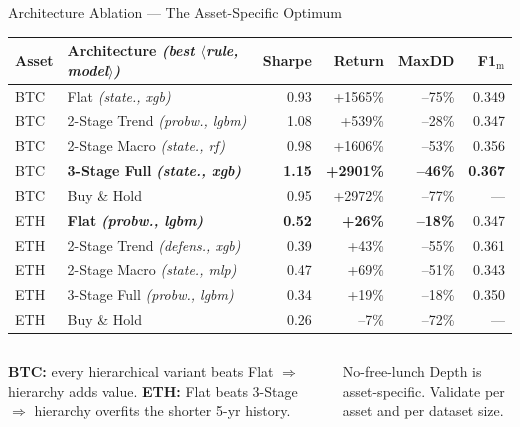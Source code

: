 \documentclass[aspectratio=169,11pt]{beamer}
\newcommand{\hl}[1]{\textcolor{itunavy}{\textbf{#1}}}
\newcommand{\fnote}[1]{{\scriptsize\textit{#1}}}
\begin{document}

\begin{frame}{Architecture Ablation --- The Asset-Specific Optimum}
\centering
{\footnotesize
\setlength{\tabcolsep}{4pt}
\renewcommand{\arraystretch}{1.0}
\begin{tabular}{@{}llrrrr@{}}
\toprule
Asset & Architecture \fnote{(best $\langle$rule, model$\rangle$)} & Sharpe & Return & MaxDD & F1$_{\text{m}}$\\
\midrule
BTC & Flat \fnote{(state., xgb)}           & 0.93 & +1565\% & --75\% & 0.349\\
BTC & 2-Stage Trend \fnote{(probw., lgbm)}  & 1.08 & +539\%  & --28\% & 0.347\\
BTC & 2-Stage Macro \fnote{(state., rf)}    & 0.98 & +1606\% & --53\% & 0.356\\
BTC & \hl{\textbf{3-Stage Full}} \fnote{\textbf{(state., xgb)}} & \hl{\textbf{1.15}} & \hl{\textbf{+2901\%}} & \hl{\textbf{--46\%}} & \hl{\textbf{0.367}}\\
BTC & Buy \& Hold                           & 0.95 & +2972\% & --77\% & ---\\
\midrule
ETH & \hl{\textbf{Flat}} \fnote{\textbf{(probw., lgbm)}} & \hl{\textbf{0.52}} & \hl{\textbf{+26\%}} & \hl{\textbf{--18\%}} & 0.347\\
ETH & 2-Stage Trend \fnote{(defens., xgb)}  & 0.39 & +43\%   & --55\% & 0.361\\
ETH & 2-Stage Macro \fnote{(state., mlp)}   & 0.47 & +69\%   & --51\% & 0.343\\
ETH & 3-Stage Full \fnote{(probw., lgbm)}   & 0.34 & +19\%   & --18\% & 0.350\\
ETH & Buy \& Hold                           & 0.26 & \alert{--7\%} & --72\% & ---\\
\bottomrule
\end{tabular}}

\vspace{6pt}
\begin{columns}[T,onlytextwidth]
\small\textbf{BTC:} every hierarchical variant beats Flat $\Rightarrow$ hierarchy adds value.
\small\textbf{ETH:} Flat beats 3-Stage $\Rightarrow$ hierarchy \alert{overfits} the shorter 5-yr history.
\small\begin{block}{No-free-lunch}
\footnotesize Depth is \alert{asset-specific}. Validate per asset and per dataset size.
\end{block}
\end{columns}
\end{frame}
\end{document}
